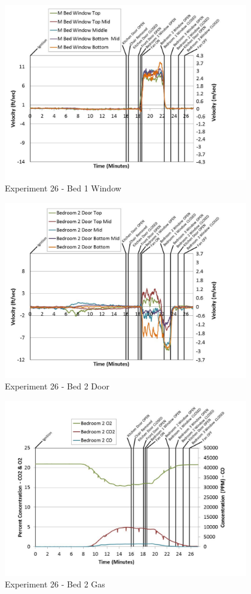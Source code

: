 \documentclass{article}
\begin{document}
\begin{appendices}
	\begin{figure}[h!]
		\centering
		\includegraphics[height=3.05in]{0_Images/Results_Charts/Exp_26_Charts/Bed1Window.pdf}
		\caption{Experiment 26 - Bed 1 Window}
	\end{figure}
 
	\clearpage

	\begin{figure}[h!]
		\centering
		\includegraphics[height=3.05in]{0_Images/Results_Charts/Exp_26_Charts/Bed2Door.pdf}
		\caption{Experiment 26 - Bed 2 Door}
	\end{figure}
 

	\begin{figure}[h!]
		\centering
		\includegraphics[height=3.05in]{0_Images/Results_Charts/Exp_26_Charts/Bed2Gas.pdf}
		\caption{Experiment 26 - Bed 2 Gas}
	\end{figure}
 

\end{appendices}
\end{document}
